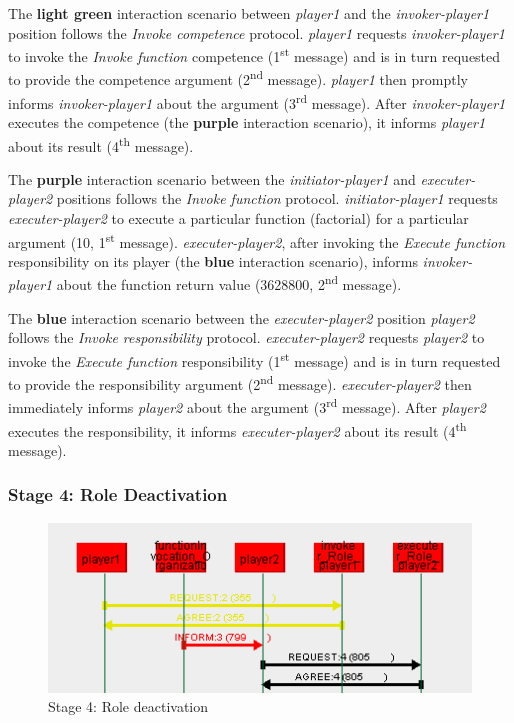 The \textbf{light green} interaction scenario between \textit{player1} and the \textit{invoker-player1} position follows the \textit{Invoke competence} protocol.
\textit{player1} requests \textit{invoker-player1} to invoke the \textit{Invoke function} competence (1\textsuperscript{st} message) and is in turn requested to provide the competence argument (2\textsuperscript{nd} message).
\textit{player1} then promptly informs \textit{invoker-player1} about the argument (3\textsuperscript{rd} message).
After \textit{invoker-player1} executes the competence (the \textbf{purple} interaction scenario), it informs \textit{player1} about its result (4\textsuperscript{th} message).

The \textbf{purple} interaction scenario between the \textit{initiator-player1} and \textit{executer-player2} positions follows the \textit{Invoke function} protocol.
\textit{initiator-player1} requests \textit{executer-player2} to execute a particular function (factorial) for a particular argument (10, 1\textsuperscript{st} message).
\textit{executer-player2}, after invoking the \textit{Execute function} responsibility on its player (the \textbf{blue} interaction scenario), informs \textit{invoker-player1} about the function return value (3628800, 2\textsuperscript{nd} message).

The \textbf{blue} interaction scenario between the \textit{executer-player2} position \textit{player2} follows the \textit{Invoke responsibility} protocol.
\textit{executer-player2} requests \textit{player2} to invoke the \textit{Execute function} responsibility (1\textsuperscript{st} message) and is in turn requested to provide the responsibility argument (2\textsuperscript{nd} message).
\textit{executer-player2} then immediately informs \textit{player2} about the argument (3\textsuperscript{rd} message).
After \textit{player2} executes the responsibility, it informs \textit{executer-player2} about its result (4\textsuperscript{th} message).

\subsubsection*{Stage 4: Role Deactivation}

\begin{figure}[H]
	\centering
	\includegraphics[width=\textwidth]{images/example1-stage4.png}
	\caption{Stage 4: Role deactivation}
	\label{figure:example1-stage4}
\end{figure}


